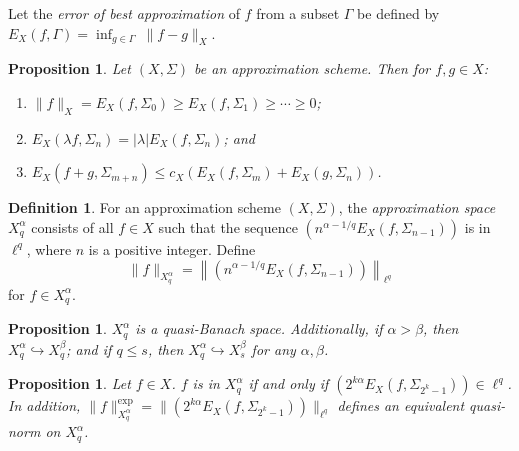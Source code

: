 \documentclass{article}
\newtheorem{proposition}[theorem]{Proposition}
\theoremstyle{definition}
\newtheorem{definition}[theorem]{Definition}
\theoremstyle{remark}
\begin{document}
Let the \textit{error of best approximation} of $f$ from a subset $\Gamma$ be defined by $\displaystyle E_X(f,\Gamma) = \inf_{g\in\Gamma} \ \lVert f-g \rVert_X$.

\begin{proposition}
    Let $(X,\Sigma)$ be an approximation scheme. Then for $f, g \in X$:
    \begin{enumerate}
        \item $\lVert f \rVert_X = E_X(f,\Sigma_0) \geq E_X(f,\Sigma_1) \geq \cdots \geq 0$;
        \item $E_X(\lambda f,\Sigma_n) = \lvert\lambda\rvert E_X(f,\Sigma_n)$; and
        \item $E_X(f+g,\Sigma_{m+n}) \leq c_X(E_X(f,\Sigma_{m})+E_X(g,\Sigma_{n}))$.
    \end{enumerate}
\end{proposition}

\begin{definition}
    For an approximation scheme $(X,\Sigma)$, the \textit{approximation space} $X_q^\alpha$ consists of all $f \in X$ such that the sequence $\left( n^{\alpha-1/q}E_X(f,\Sigma_{n-1}) \right)$ is in $\ell^q$, where $n$ is a positive integer. Define
    \[\lVert f \rVert_{X_q^\alpha} = \left\lVert \left( n^{\alpha-1/q}E_X(f,\Sigma_{n-1}) \right) \right\rVert_{\ell^q}\]
    for $f \in X_q^\alpha$.
\end{definition}

\begin{proposition}
    $X_q^\alpha$ is a quasi-Banach space. Additionally, if $\alpha > \beta$, then $X_q^\alpha \hookrightarrow X_q^\beta$; and if $q \leq s$, then $X_q^\alpha \hookrightarrow X_s^\beta$ for any $\alpha,\beta$.
\end{proposition}

\begin{proposition}
\label{expnorm}
    Let $f \in X$. $f$ is in $X_q^\alpha$ if and only if $\left( 2^{k\alpha}E_X(f,\Sigma_{2^k-1}) \right) \in \ell^q$. In addition, $\lVert f \rVert_{X_q^\alpha}^\mathrm{exp} = \lVert \left( 2^{k\alpha}E_X(f,\Sigma_{2^k-1}) \right) \rVert_{\ell^q}$ defines an equivalent quasi-norm on $X_q^\alpha$.
\end{proposition}
\end{document}

